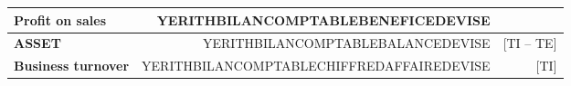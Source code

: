 \documentclass[10pt,YERITHPAPERSPEC,landscape]{article} %
\begin{document}
\vspace*{0.1em}

\begin{table}[!htbp]
\centering
\begin{tabular}{lrr}
\textbf{Profit on sales}  	&  YERITHBILANCOMPTABLEBENEFICEDEVISE &  \\ \hline
\textbf{ASSET}  				&  YERITHBILANCOMPTABLEBALANCEDEVISE  & [TI -- TE]\\ \hline
\textbf{Business turnover}  &  YERITHBILANCOMPTABLECHIFFREDAFFAIREDEVISE  & [TI]\\ 
\end{tabular}
\end{table}

\end{document}
